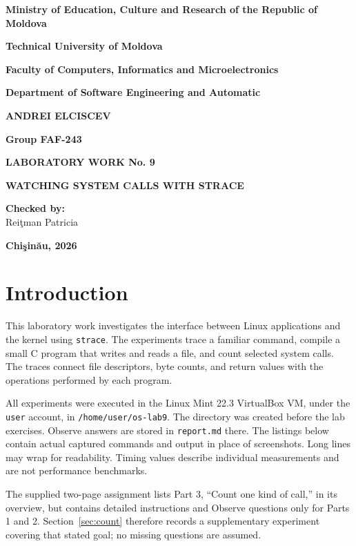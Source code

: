 \documentclass[12pt,a4paper]{article}
\begin{document}
\begin{titlepage}
\centering
\textbf{Ministry of Education, Culture and Research of the Republic of Moldova}\par\medskip
\textbf{Technical University of Moldova}\par\medskip
\textbf{Faculty of Computers, Informatics and Microelectronics}\par\medskip
\textbf{Department of Software Engineering and Automatic}\par
\vspace{2.5cm}
\textbf{ANDREI ELCISCEV}\par
\textbf{Group FAF-243}\par
\vspace{2cm}
{\Large\textbf{LABORATORY WORK No. 9}\par}
\medskip
{\Large\textbf{WATCHING SYSTEM CALLS WITH STRACE}\par}
\vspace{2cm}
\begin{flushright}
\textbf{Checked by:}\\
Rei\c{t}man Patricia
\end{flushright}
\vfill
\textbf{Chi\c{s}in\u{a}u, 2026}
\end{titlepage}
\tableofcontents
\newpage
\section{Introduction}
This laboratory work investigates the interface between Linux applications and the
kernel using \texttt{strace}. The experiments trace a familiar command, compile a
small C program that writes and reads a file, and count selected system calls.
The traces connect file descriptors, byte counts, and return values with the
operations performed by each program.

All experiments were executed in the Linux Mint 22.3 VirtualBox VM, under the
\texttt{user} account, in \texttt{/home/user/os-lab9}. The directory was created
before the lab exercises. Observe answers are stored in \texttt{report.md} there.
The listings below contain actual captured commands and output in place of
screenshots. Long lines may wrap for readability. Timing values describe individual
measurements and are not performance benchmarks.

The supplied two-page assignment lists Part 3, ``Count one kind of call,'' in its
overview, but contains detailed instructions and Observe questions only for Parts
1 and 2. Section~\ref{sec:count} therefore records a supplementary experiment
covering that stated goal; no missing questions are assumed.
\end{document}
